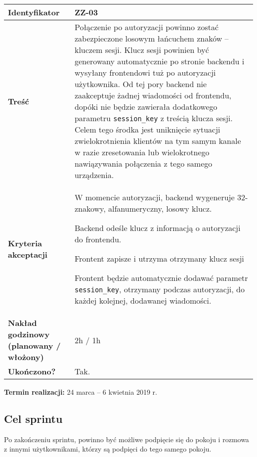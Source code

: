 \begin{tabular}{ | l | l | }
	\hline
		\textbf{Identyfikator} &
		ZZ-03
		\\

	\hline
		\textbf{Treść} & \parbox[t]{11.5cm}{\strut
			Połączenie po autoryzacji powinno zostać zabezpieczone losowym łańcuchem
      znaków -- kluczem sesji. Klucz sesji powinien być generowany
      automatycznie po stronie backendu i wysyłany frontendowi tuż po
      autoryzacji użytkownika. Od tej pory backend nie zaakceptuje żadnej
      wiadomości od frontendu, dopóki nie
      będzie zawierała dodatkowego parametru \texttt{session\_key} z treścią
      klucza sesji. Celem tego środka jest uniknięcie sytuacji zwielokrotnienia
      klientów na tym samym kanale w razie zresetowania lub wielokrotnego
      nawiązywania połączenia z tego samego urządzenia.
		\strut}\\

	\hline
		\parbox[t]{4cm}{\textbf{Kryteria akceptacji}} & \parbox[t]{11.5cm}{\strut
			\begin{enumreq}
				\item W momencie autoryzacji, backend wygeneruje 32-znakowy,
        alfanumeryczny, losowy klucz.
        \item Backend odeśle klucz z informacją o autoryzacji do frontendu.
        \item Frontent zapisze i utrzyma otrzymany klucz sesji
        \item Frontent będzie automatycznie dodawać parametr \texttt{session\_key},
        otrzymany podczas autoryzacji, do każdej kolejnej, dodawanej wiadomości.
			\end{enumreq}
			\strut}
		\\

    \hline
  		\parbox[t]{4cm}{\textbf{Nakład godzinowy (planowany / włożony)}} &
      \parbox[t]{11.5cm}{\strut
  			2h / 1h
  		\strut}\\

        \hline
          \parbox[t]{4cm}{\textbf{Ukończono?}} &
          \parbox[t]{11.5cm}{\strut
            Tak.
          \strut}\\

          \hline
      \end{tabular}

      \vspace{1em}


\textbf{Termin realizacji:} 24 marca -- 6 kwietnia 2019 r.

\subsection{Cel sprintu}
Po zakończeniu sprintu, powinno być możliwe podpięcie się do pokoju i rozmowa z
innymi użytkownikami, którzy są podpięci do tego samego pokoju.

